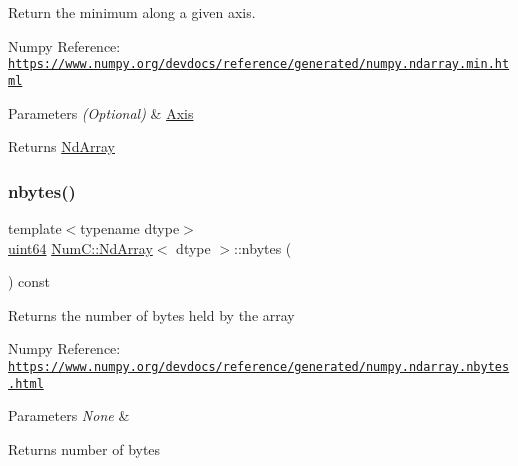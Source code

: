 Return the minimum along a given axis.

Numpy Reference\+: \href{https://www.numpy.org/devdocs/reference/generated/numpy.ndarray.min.html}{\tt https\+://www.\+numpy.\+org/devdocs/reference/generated/numpy.\+ndarray.\+min.\+html}


\begin{DoxyParams}{Parameters}
{\em (\+Optional)} & \mbox{\hyperlink{struct_num_c_1_1_axis}{Axis}} \\
\hline
\end{DoxyParams}
\begin{DoxyReturn}{Returns}
\mbox{\hyperlink{class_num_c_1_1_nd_array}{Nd\+Array}} 
\end{DoxyReturn}
\mbox{\label{class_num_c_1_1_nd_array_a68b69a2bce03b4a10961c51fff965522}} 
\subsubsection{\texorpdfstring{nbytes()}{nbytes()}}
{\footnotesize\ttfamily template$<$typename dtype$>$ \\
\mbox{\hyperlink{namespace_num_c_a22306a0884a815781c5b147415f6d817}{uint64}} \mbox{\hyperlink{class_num_c_1_1_nd_array}{Num\+C\+::\+Nd\+Array}}$<$ dtype $>$\+::nbytes (\begin{DoxyParamCaption}{ }\end{DoxyParamCaption}) const\hspace{0.3cm}{\ttfamily [inline]}}

Returns the number of bytes held by the array

Numpy Reference\+: \href{https://www.numpy.org/devdocs/reference/generated/numpy.ndarray.nbytes.html}{\tt https\+://www.\+numpy.\+org/devdocs/reference/generated/numpy.\+ndarray.\+nbytes.\+html}


\begin{DoxyParams}{Parameters}
{\em None} & \\
\hline
\end{DoxyParams}
\begin{DoxyReturn}{Returns}
number of bytes 
\end{DoxyReturn}
\mbox{\label{class_num_c_1_1_nd_array_a992b403fa64d2d3c4516b0ca9328de66}} 
